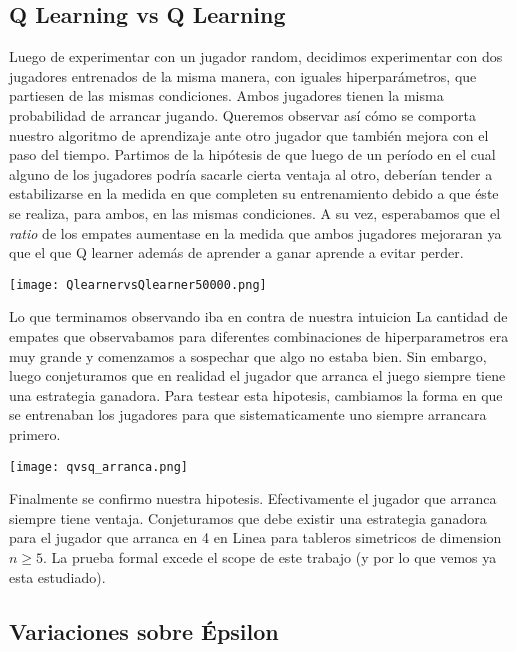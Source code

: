 \documentclass[10pt,a4paper]{article}
\begin{document}
\subsection{Q Learning vs Q Learning}

Luego de experimentar con un jugador random, decidimos experimentar con dos jugadores entrenados de la misma manera, con iguales hiperparámetros, que partiesen de las mismas condiciones. Ambos jugadores tienen la misma probabilidad de arrancar jugando. Queremos observar así cómo se comporta nuestro algoritmo de aprendizaje ante otro jugador que también mejora con el paso del tiempo. Partimos de la hipótesis de que luego de un período en el cual alguno de los jugadores podría sacarle cierta ventaja al otro, deberían tender a estabilizarse en la medida en que completen su entrenamiento debido a que éste se realiza, para ambos, en las mismas condiciones. A su vez, esperabamos que el \textit{ratio} de los empates aumentase en la medida que ambos jugadores mejoraran ya que el que Q learner además de aprender a ganar aprende a evitar perder.

\begin{center}
\texttt{[image: QlearnervsQlearner50000.png]}
\end{center}

Lo que terminamos observando iba en contra de nuestra intuicion La cantidad de empates que observabamos para diferentes combinaciones de hiperparametros era muy grande y comenzamos a sospechar que algo no estaba bien. Sin embargo, luego conjeturamos que en realidad el jugador que arranca el juego siempre tiene una estrategia ganadora. Para testear esta hipotesis, cambiamos la forma en que se entrenaban los jugadores para que sistematicamente uno siempre arrancara primero.

\begin{center}
\texttt{[image: qvsq\_arranca.png]}
\end{center}

Finalmente se confirmo nuestra hipotesis. Efectivamente el jugador que arranca siempre tiene ventaja. Conjeturamos que debe existir una estrategia ganadora para el jugador que arranca en 4 en Linea para tableros simetricos de dimension $n \geq 5$. La prueba formal excede el scope de este trabajo (y por lo que vemos ya esta estudiado).

\subsection{Variaciones sobre Épsilon}
\end{document}
